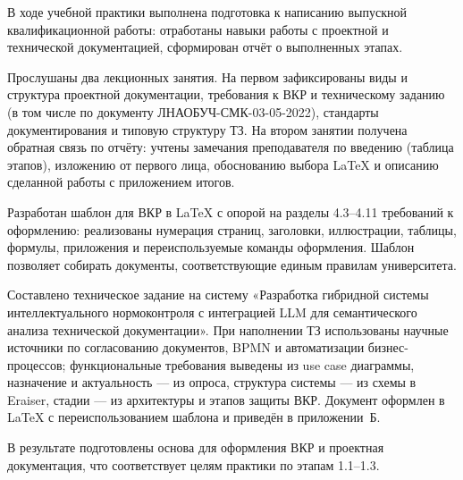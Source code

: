 
В ходе учебной практики выполнена подготовка к написанию выпускной квалификационной работы: отработаны навыки работы с проектной и технической документацией, сформирован отчёт о выполненных этапах.

Прослушаны два лекционных занятия. На первом зафиксированы виды и структура проектной документации, требования к ВКР и техническому заданию (в том числе по документу ЛНАОБУЧ-СМК-03-05-2022), 
стандарты документирования и типовую структуру ТЗ. На втором занятии получена обратная связь по отчёту: учтены замечания преподавателя по введению (таблица этапов), изложению от первого лица, 
обоснованию выбора LaTeX и описанию сделанной работы с приложением итогов.

Разработан шаблон для ВКР в LaTeX с опорой на разделы 4.3--4.11 требований к оформлению: реализованы нумерация страниц, заголовки, иллюстрации, таблицы, формулы, приложения и переиспользуемые команды оформления. 
Шаблон позволяет собирать документы, соответствующие единым правилам университета.

Составлено техническое задание на систему «Разработка гибридной системы интеллектуального нормоконтроля с интеграцией LLM для семантического анализа технической документации». 
При наполнении ТЗ использованы научные источники по согласованию документов, BPMN и автоматизации бизнес-процессов; функциональные требования выведены из use case диаграммы, 
назначение и актуальность --- из опроса, структура системы --- из схемы в Eraiser, стадии --- из архитектуры и этапов защиты ВКР. Документ оформлен в LaTeX с переиспользованием шаблона и приведён в приложении~Б.

В результате подготовлены основа для оформления ВКР и проектная документация, что соответствует целям практики по этапам 1.1--1.3.


